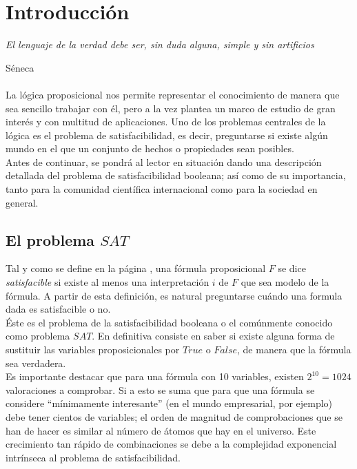\chapter*{Introducción}


\hfil \textit{El lenguaje de la verdad debe ser, sin duda alguna, simple y sin artificios}

\hfil \hfil \hfil \hfil Séneca\\\\


La lógica proposicional nos permite representar el conocimiento de manera que sea sencillo trabajar con él, pero a la vez plantea un marco de estudio de gran interés y con multitud de aplicaciones. Uno de los problemas centrales de la lógica es el problema de satisfacibilidad, es decir, preguntarse si existe algún mundo en el que un conjunto de hechos o propiedades sean posibles.\\

Antes de continuar, se pondrá al lector en situación dando una descripción detallada del problema de satisfacibilidad booleana; así como de su importancia, tanto para la comunidad científica internacional como para la sociedad en general.

\section{El problema $SAT$}

Tal y como se define en la página \pageref{def:sat}, una fórmula proposicional $F$ se dice \textit{satisfacible} si existe al menos una interpretación $i$ de $F$ que sea modelo de la fórmula. A partir de esta definición, es natural preguntarse cuándo una formula dada es satisfacible o no. \\ 

Éste es el problema de la satisfacibilidad booleana o el comúnmente conocido como problema $SAT$. En definitiva consiste en saber si existe alguna forma de sustituir las variables proposicionales por $True$ o $False$, de manera que la fórmula sea verdadera. \\

Es importante destacar que para una fórmula con 10 variables, existen $2^{10} = 1024$ valoraciones a comprobar. Si a esto se suma que para que una fórmula se considere ``mínimamente interesante'' (en el mundo empresarial, por ejemplo) debe tener cientos de variables; el orden de magnitud de comprobaciones que se han de hacer es similar al número de átomos que hay en el universo. Este crecimiento tan rápido de combinaciones se debe a la complejidad exponencial intrínseca al problema de satisfacibilidad. \\

